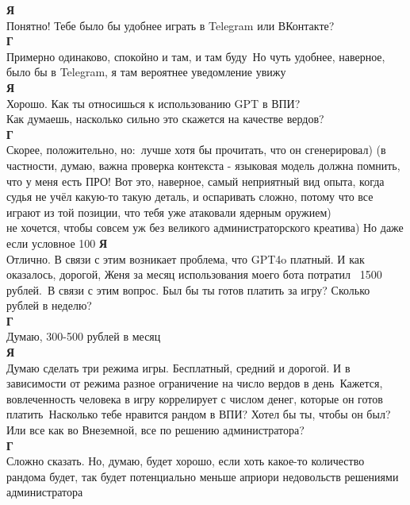\textbf{Я}\\
Понятно! Тебе было бы удобнее играть в Telegram или ВКонтакте?\\

\textbf{Г}\\
Примерно одинаково, спокойно и там, и там буду\
Но чуть удобнее, наверное, было бы в Telegram, я там вероятнее уведомление увижу\\

\textbf{Я}\\
Хорошо. Как ты относишься к использованию GPT в ВПИ?\\
Как думаешь, насколько сильно это скажется на качестве вердов?\\

\textbf{Г}\\
Скорее, положительно, но:\
лучше хотя бы прочитать, что он сгенерировал) (в частности, думаю, важна проверка контекста - языковая модель должна помнить, что у меня есть ПРО! Вот это, наверное, самый неприятный вид опыта, когда судья не учёл какую-то такую деталь, и оспаривать сложно, потому что все играют из той позиции, что тебя уже атаковали ядерным оружием)\\
не хочется, чтобы совсем уж без великого администраторского креатива) Но даже если условное 100%
\textbf{Я}\\
Отлично. В связи с этим возникает проблема, что GPT4o платный. И как оказалось, дорогой, Женя за месяц использования моего бота потратил ~1500 рублей.\
В связи с этим вопрос. Был бы ты готов платить за игру? Сколько рублей в неделю?\\

\textbf{Г}\\
Думаю, 300-500 рублей в месяц\\

\textbf{Я}\\
Думаю сделать три режима игры. Бесплатный, средний и дорогой. И в зависимости от режима разное ограничение на число вердов в день\
Кажется, вовлеченность человека в игру коррелирует с числом денег, которые он готов платить\
Насколько тебе нравится рандом в ВПИ? Хотел бы ты, чтобы он был? Или все как во Внеземной, все по решению администратора?\\

\textbf{Г}\\
Сложно сказать. Но, думаю, будет хорошо, если хоть какое-то количество рандома будет, так будет потенциально меньше априори недовольств решениями администратора\\

